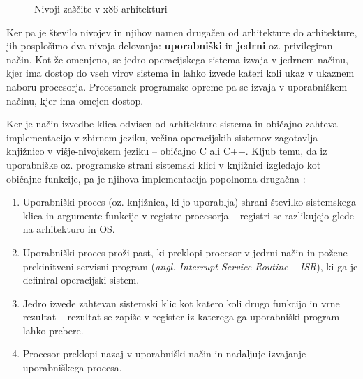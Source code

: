 \documentclass[a4paper,12pt,openright]{book}
\begin{document}
\begin{figure}[h!]
	\begin{center}
	\end{center}
	\caption{Nivoji zaščite v x86 arhitekturi \cite{Intel_2024}}
	\label{fig:privilege_levels_x86}
\end{figure}

Ker pa je število nivojev in njihov namen drugačen od arhitekture do arhitekture, jih posplošimo dva nivoja delovanja: \textbf{uporabniški} in \textbf{jedrni} oz. privilegiran način.
Kot že omenjeno, se jedro operacijskega sistema izvaja v jedrnem načinu, kjer ima dostop do vseh virov sistema in lahko izvede kateri koli ukaz v ukaznem naboru procesorja.
Preostanek programske opreme pa se izvaja v uporabniškem načinu, kjer ima omejen dostop.

Ker je način izvedbe klica odvisen od arhitekture sistema in običajno zahteva implementacijo v zbirnem jeziku, večina operacijskih sistemov zagotavlja knjižnico v višje-nivojskem jeziku -- običajno C ali C++.
Kljub temu, da iz uporabniške oz. programske strani sistemski klici v knjižnici izgledajo kot običajne funkcije, pa je njihova implementacija popolnoma drugačna \cite{Tanenbaum_Bos_2023}:
\begin{enumerate}
	\item Uporabniški proces (oz. knjižnica, ki jo uporablja) shrani številko sistemskega klica in argumente funkcije v registre procesorja -- registri se razlikujejo glede na arhitekturo in OS.
	\item Uporabniški proces proži past, ki preklopi procesor v jedrni način in požene prekinitveni servisni program (\textit{angl. Interrupt Service Routine -- ISR}), ki ga je definiral operacijski sistem.
	\item Jedro izvede zahtevan sistemski klic kot katero koli drugo funkcijo in vrne rezultat -- rezultat se zapiše v register iz katerega ga uporabniški program lahko prebere.
	\item Procesor preklopi nazaj v uporabniški način in nadaljuje izvajanje uporabniškega procesa.
\end{enumerate}
\end{document}
